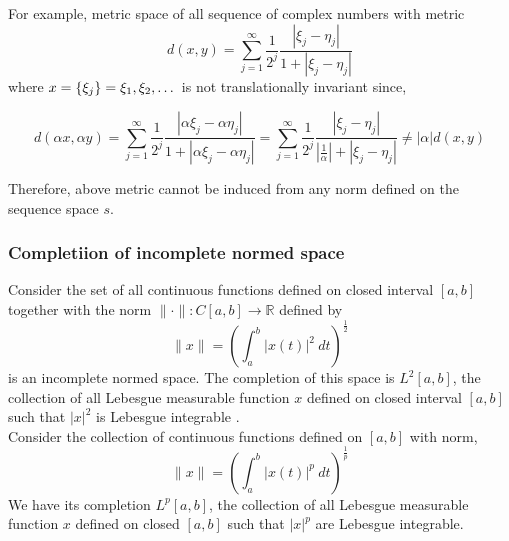 	For example, metric space of all sequence of complex numbers with metric
	$$d(x,y) = \sum_{j = 1}^\infty \frac{1}{2^j} \frac{|\xi_j-\eta_j|}{1+|\xi_j-\eta_j|}$$
	where $x = \{\xi_j\} = \xi_1,\xi_2,\dots$ is not translationally invariant since,

	$$ d(\alpha x, \alpha y) = \sum_{j = 1}^\infty \frac{1}{2^j} \frac{|\alpha\xi_j-\alpha\eta_j|}{1+|\alpha\xi_j - \alpha\eta_j|} = \sum_{j=1}^\infty \frac{1}{2^j} \frac{|\xi_j - \eta_j|}{\left|\frac{1}{\alpha}\right|+|\xi_j-\eta_j|} \ne |\alpha| d(x,y) $$

	Therefore, above metric cannot be induced from any norm defined on the sequence space $s$.
	
\subsubsection{Completiion of incomplete normed space}
	Consider the set of all continuous functions defined on closed interval $[a,b]$ together with the norm $\| \cdot \| : C[a,b] \to \mathbb{R}$ defined by
	$$ \|x\| = \left( \int_a^b |x(t)|^2\ dt \right)^\frac{1}{2}$$
	is an incomplete normed space.
	The completion of this space is $L^2[a,b]$, the collection of all Lebesgue measurable function $x$ defined on closed interval $[a,b]$ such that $|x|^2$ is Lebesgue integrable .\\

	Consider the collection of continuous functions defined on $[a,b]$ with norm,
	$$\|x\| = \left( \int_a^b |x(t)|^p\ dt \right)^\frac{1}{p}$$
	We have its completion $L^p[a,b]$, the collection of all Lebesgue measurable function $x$ defined on closed $[a,b]$ such that $|x|^p$ are Lebesgue integrable.

